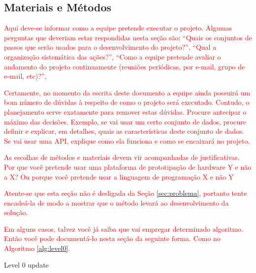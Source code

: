 \subsection{Materiais e Métodos}

\textcolor{red}{Aqui deve-se informar como a equipe pretende executar o projeto. Algumas perguntas que deveriam estar respondidas nesta seção são: “Quais os conjuntos de passos que serão usados para o desenvolvimento do projeto?”, “Qual a organização sistemática das ações?”, “Como a equipe pretende avaliar o andamento do projeto continuamente (reuniões periódicas, por e-mail, grupo de e-mail, etc)?”, }

\textcolor{red}{Certamente, no momento da escrita deste documento a equipe ainda possuirá um bom número de dúvidas à respeito de como o projeto será executado. Contudo, o planejamento serve exatamente para remover estas dúvidas. Procure antecipar o máximo das decisões. Exemplo, se vai usar um certo conjunto de dados, procure definir e explicar, em detalhes, quais as características deste conjunto de dados. Se vai usar uma API, explique como ela funciona e como se encaixará no projeto.}

\textcolor{red}{As escolhas de métodos e materiais devem vir acompanhadas de justificativas. Por que você pretende usar uma plataforma de prototipação de hardware Y e não a X? Ou porque você pretende usar a linguagem de programação X e não Y}

\textcolor{red}{Atente-se que esta seção não é desligada da Seção \ref{sec:problema}, portanto tente encadeá-la de modo a mostrar que o método levará ao desenvolvimento da solução.}

\textcolor{red}{Em alguns casos, talvez você já saiba que vai empregar determinado algoritmo. Então você pode documentá-lo nesta seção da seguinte forma. Como no Algoritmo \ref{alg:level0}.}

\begin{algorithm}[hbt!]
\caption{Level 0 update}\label{alg:level0}


\end{algorithm}

